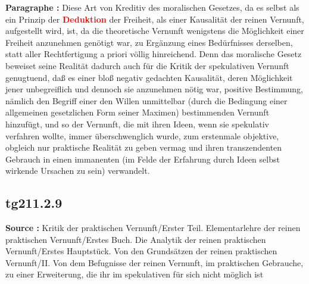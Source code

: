 \documentclass[a4paper,12pt,twoside]{book}
\newcommand{\match}[1]{\textcolor{red}{\textbf{#1}}}
\begin{document}
	\noindent\textbf{Paragraphe : }Diese Art von Kreditiv des moralischen Gesetzes, da es selbst als ein Prinzip der \match{Deduktion} der Freiheit, als einer Kausalität der reinen Vernunft, aufgestellt wird, ist, da die theoretische Vernunft wenigstens die Möglichkeit einer Freiheit anzunehmen genötigt war, zu Ergänzung eines Bedürfnisses derselben, statt aller Rechtfertigung a priori völlig hinreichend. Denn das moralische Gesetz beweiset seine Realität dadurch auch für die Kritik der spekulativen Vernunft genugtuend, daß es einer bloß negativ gedachten Kausalität, deren Möglichkeit jener unbegreiflich und dennoch sie anzunehmen nötig war, positive Bestimmung, nämlich den Begriff einer den Willen unmittelbar (durch die Bedingung einer allgemeinen gesetzlichen Form seiner Maximen) bestimmenden Vernunft hinzufügt, und so der Vernunft, die mit ihren Ideen, wenn sie spekulativ verfahren wollte, immer überschwenglich wurde, zum erstenmale objektive, obgleich nur praktische Realität zu geben vermag und ihren transzendenten Gebrauch in einen immanenten (im Felde der Erfahrung durch Ideen selbst wirkende Ursachen zu sein) verwandelt. 
	
	\subsection*{tg211.2.9} 
	\textbf{Source : }Kritik der praktischen Vernunft/Erster Teil. Elementarlehre der reinen praktischen Vernunft/Erstes Buch. Die Analytik der reinen praktischen Vernunft/Erstes Hauptstück. Von den Grundsätzen der reinen praktischen Vernunft/II. Von dem Befugnisse der reinen Vernunft, im praktischen Gebrauche, zu einer Erweiterung, die ihr im spekulativen für sich nicht möglich ist\\  
	
\end{document}
